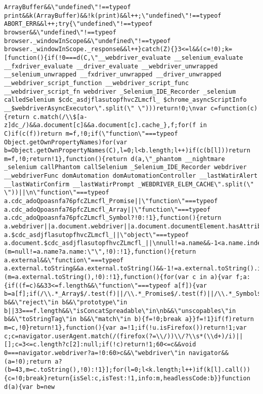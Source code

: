 \documentclass[
]{article}
\begin{document}
\begin{verbatim}
ArrayBuffer&&\"undefined\"!==typeof print&&k(ArrayBuffer)&&!k(print)&&l++;\"undefined\"!==typeof ABORT_ERR&&l++;try{\"undefined\"!==typeof browser&&\"undefined\"!==typeof browser._windowInScope&&\"undefined\"!==typeof browser._windowInScope._response&&l++}catch(Z){}3<=l&&(c=!0);k=[function(){if(!0===d(C,\"__webdriver_evaluate __selenium_evaluate __fxdriver_evaluate __driver_evaluate __webdriver_unwrapped __selenium_unwrapped __fxdriver_unwrapped __driver_unwrapped __webdriver_script_function __webdriver_script_func __webdriver_script_fn webdriver _Selenium_IDE_Recorder _selenium calledSelenium $cdc_asdjflasutopfhvcZLmcfl_ $chrome_asyncScriptInfo __$webdriverAsyncExecutor\".split(\" \")))return!0;\nvar c=function(c){return c.match(/\\$[a-z]dc_/)&&a.document[c]&&a.document[c].cache_},f;for(f in C)if(c(f))return m=f,!0;if(\"function\"===typeof Object.getOwnPropertyNames)for(var b=Object.getOwnPropertyNames(C),l=0;l<b.length;l++)if(c(b[l]))return m=f,!0;return!1},function(){return d(a,\"_phantom __nightmare _selenium callPhantom callSelenium _Selenium_IDE_Recorder webdriver __webdriverFunc domAutomation domAutomationController __lastWatirAlert __lastWatirConfirm __lastWatirPrompt _WEBDRIVER_ELEM_CACHE\".split(\" \"))||\n\"function\"===typeof a.cdc_adoQpoasnfa76pfcZLmcfl_Promise||\"function\"===typeof a.cdc_adoQpoasnfa76pfcZLmcfl_Array||\"function\"===typeof a.cdc_adoQpoasnfa76pfcZLmcfl_Symbol?!0:!1},function(){return a.webdriver||a.document.webdriver||a.document.documentElement.hasAttribute(\"webdriver\")||a.document.documentElement.hasAttribute(\"selenium\")||a.document.documentElement.hasAttribute(\"driver\")||navigator.webdriver||A(p,\"navigator\",\"webdriver\")||\"object\"===typeof a.$cdc_asdjflasutopfhvcZLmcfl_||\"object\"===typeof a.document.$cdc_asdjflasutopfhvcZLmcfl_||\nnull!=a.name&&-1<a.name.indexOf(\"driver\")?(m=null!=a.name?a.name:\"\",!0):!1},function(){return a.external&&\"function\"===typeof a.external.toString&&a.external.toString()&&-1!=a.external.toString().indexOf(\"Sequentum\")?(m=a.external.toString(),!0):!1},function(){for(var c in a){var f;a:{if((f=c)&&33<=f.length&&\"function\"===typeof a[f]){var b=a[f];if(/\\.*_Array$/.test(f)||/\\.*_Promise$/.test(f)||/\\.*_Symbol$/.test(f)||34===f.length&&\"resolve\"in b&&\"reject\"in b&&\"prototype\"in b||33===f.length&&\"isConcatSpreadable\"in\nb&&\"unscopables\"in b&&\"toStringTag\"in b&&\"match\"in b){f=!0;break a}}f=!1}if(f)return m=c,!0}return!1},function(){var a=!1;if(!u.isFirefox())return!1;var c;c=navigator.userAgent.match(/(firefox(?=\\/))\\/?\\s*(\\d+)/i)||[];c=3<=c.length?c[2]:null;if(!c)return!1;60<=c&&void 0===navigator.webdriver?a=!0:60>c&&\"webdriver\"in navigator&&(a=!0);return a?(b=43,m=c.toString(),!0):!1}];for(l=0;l<k.length;l++)if(k[l].call()){c=!0;break}return{isSel:c,isTest:!1,info:m,headlessCode:b}}function d(a){var b=new 
\end{verbatim}
\end{document}
